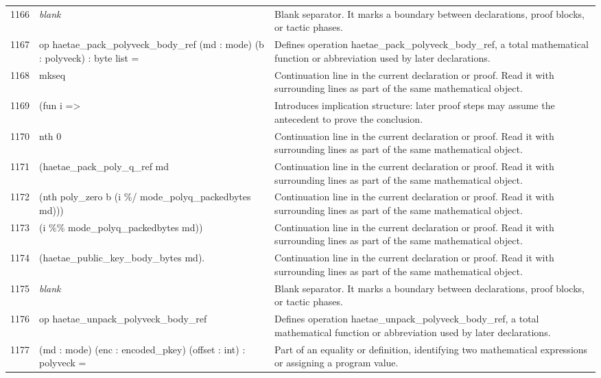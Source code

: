 \documentclass[10pt]{article}
\begin{document}
\begin{longtable}{r L{0.53\textwidth} L{0.37\textwidth}}
1166 & {\ttfamily\scriptsize \emph{blank}} & Blank separator.  It marks a boundary between declarations, proof blocks, or tactic phases. \\
1167 & {\ttfamily\scriptsize op haetae\_pack\_polyveck\_body\_ref (md : mode) (b : polyveck) : byte list =} & Defines operation haetae\_pack\_polyveck\_body\_ref, a total mathematical function or abbreviation used by later declarations. \\
1168 & {\ttfamily\scriptsize   mkseq} & Continuation line in the current declaration or proof.  Read it with surrounding lines as part of the same mathematical object. \\
1169 & {\ttfamily\scriptsize     (fun i =>} & Introduces implication structure: later proof steps may assume the antecedent to prove the conclusion. \\
1170 & {\ttfamily\scriptsize       nth 0} & Continuation line in the current declaration or proof.  Read it with surrounding lines as part of the same mathematical object. \\
1171 & {\ttfamily\scriptsize         (haetae\_pack\_poly\_q\_ref md} & Continuation line in the current declaration or proof.  Read it with surrounding lines as part of the same mathematical object. \\
1172 & {\ttfamily\scriptsize           (nth poly\_zero b (i \%/ mode\_polyq\_packedbytes md)))} & Continuation line in the current declaration or proof.  Read it with surrounding lines as part of the same mathematical object. \\
1173 & {\ttfamily\scriptsize         (i \%\% mode\_polyq\_packedbytes md))} & Continuation line in the current declaration or proof.  Read it with surrounding lines as part of the same mathematical object. \\
1174 & {\ttfamily\scriptsize     (haetae\_public\_key\_body\_bytes md).} & Continuation line in the current declaration or proof.  Read it with surrounding lines as part of the same mathematical object. \\
1175 & {\ttfamily\scriptsize \emph{blank}} & Blank separator.  It marks a boundary between declarations, proof blocks, or tactic phases. \\
1176 & {\ttfamily\scriptsize op haetae\_unpack\_polyveck\_body\_ref} & Defines operation haetae\_unpack\_polyveck\_body\_ref, a total mathematical function or abbreviation used by later declarations. \\
1177 & {\ttfamily\scriptsize    (md : mode) (enc : encoded\_pkey) (offset : int) : polyveck =} & Part of an equality or definition, identifying two mathematical expressions or assigning a program value. \\

\end{longtable}
\end{document}
